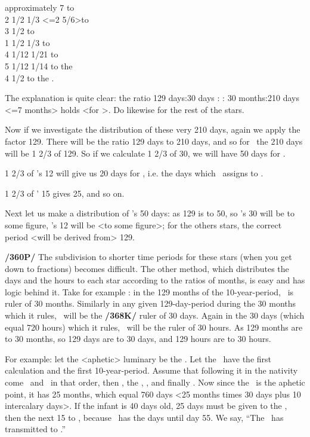 \noindent approximately 7 to \Saturn \\
2 1/2 1/3 <=2 5/6>to \Jupiter \\
3 1/2 to \Mars \\
1 1/2 1/3 to \Venus \\
4 1/12 1/21 to \Mercury \\
5 1/12 1/14 to the \Moon \\
4 1/2 to the \Sun. 

The explanation is quite clear: 
the ratio 129 days:30 days : : 30 months:210 days <=7 months>
holds <for \Saturn>. Do likewise for the rest of the stars.

Now if we investigate the distribution of these very 210 days, again we apply the factor 129. There will be the ratio 129 days to 210 days, and so for \Saturn\, the 210 days will be 1 2/3 of 129. So if we
calculate 1 2/3 of 30, we will have 50 days for \Saturn. 

1 2/3 of \Jupiter’s 12 will give us 20 days for \Jupiter, i.e. the days which \Saturn\, assigns to \Jupiter. 

1 2/3 of \Mars’ 15 gives 25, and so on.

Next let us make a distribution of \Saturn’s 50 days: as 129 is to 50, so \Saturn’s 30 will be to some figure, \Jupiter’s 12 will be <to some figure>; for the others stars, the correct period <will be derived from> 129.

\textbf{/360P/} The subdivision to shorter time periods for these stars (when you get down to fractions) becomes difficult. The other method, which distributes the days and the hours to each star according to the ratios of months, is easy and has logic behind it. Take for example \Saturn: in the 129 months of the 10-year-period, \Saturn\, is ruler of 30 months. Similarly in any given 129-day-period during the 30 months which it rules, \Saturn\, will be the \textbf{/368K/} ruler of 30 days. Again in the 30 days (which equal 720 hours) which it rules, \Saturn\, will be the ruler of 30 hours. As 129 months are to 30 months, so 129 days are to 30 days, and 129 hours are to 30 hours. 

For example: let the <aphetic> luminary be the \Moon. Let the \Moon\, have the first calculation and the first 10-year-period. Assume that following it in the nativity come \Saturn\, and \Jupiter\, in that order, then \Mars, the \Sun, \Venus, and finally \Mercury. Now since the \Moon\, is the aphetic point, it has 25 months, which equal 760 days <25 months times 30 days plus 10 intercalary days>. If the infant is 40 days old, 25 days must be given to the \Moon, then the next 15 to \Saturn, because \Saturn\, has the days until day 55. We say, “The \Moon\, has transmitted to \Saturn.” 

